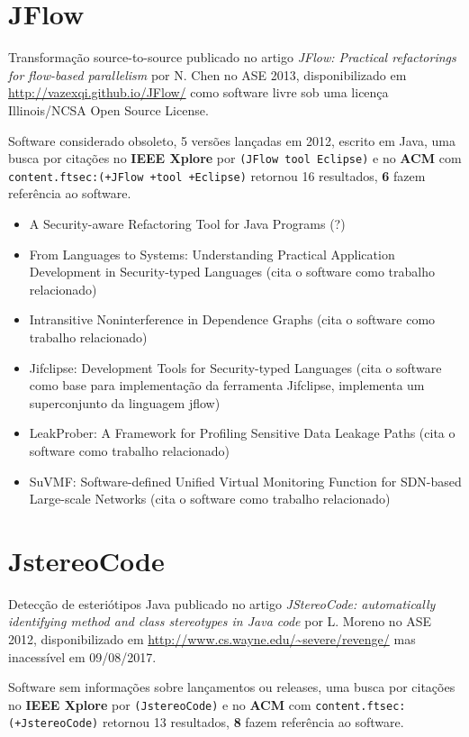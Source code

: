 \section{JFlow}

Transformação source-to-source
publicado no artigo {\it JFlow: Practical refactorings for flow-based parallelism}
por N. Chen
no ASE 2013,
disponibilizado em \url{http://vazexqi.github.io/JFlow/}
como software livre
sob uma licença Illinois/NCSA Open Source License.

Software considerado obsoleto,
5 versões lançadas
em 2012,
escrito em Java,
uma busca por citações no {\bf IEEE Xplore} por
\texttt{(JFlow tool Eclipse)}
e no {\bf ACM} com
\texttt{content.ftsec:(+JFlow +tool +Eclipse)}
retornou
16 resultados,
{\bf 6} fazem referência ao software.

\begin{itemize}
\item A Security-aware Refactoring Tool for Java Programs (?)
\item From Languages to Systems: Understanding Practical Application Development in Security-typed Languages (cita o software como trabalho relacionado)
\item Intransitive Noninterference in Dependence Graphs (cita o software como trabalho relacionado)
\item Jifclipse: Development Tools for Security-typed Languages (cita o software como base para implementação da ferramenta Jifclipse, implementa um superconjunto da linguagem jflow)
\item LeakProber: A Framework for Profiling Sensitive Data Leakage Paths (cita o software como trabalho relacionado)
\item SuVMF: Software-defined Unified Virtual Monitoring Function for SDN-based Large-scale Networks (cita o software como trabalho relacionado)
\end{itemize}

\section{JstereoCode}

Detecção de esteriótipos Java
publicado no artigo {\it JStereoCode: automatically identifying method and class stereotypes in Java code}
por L. Moreno
no ASE 2012,
disponibilizado em \url{http://www.cs.wayne.edu/~severe/revenge/}
mas inacessível em 09/08/2017.

Software sem informações sobre lançamentos ou releases,
uma busca por citações no {\bf IEEE Xplore} por
\texttt{(JstereoCode)}
e no {\bf ACM} com
\texttt{content.ftsec:(+JstereoCode)}
retornou
13 resultados,
{\bf 8} fazem referência ao software.

